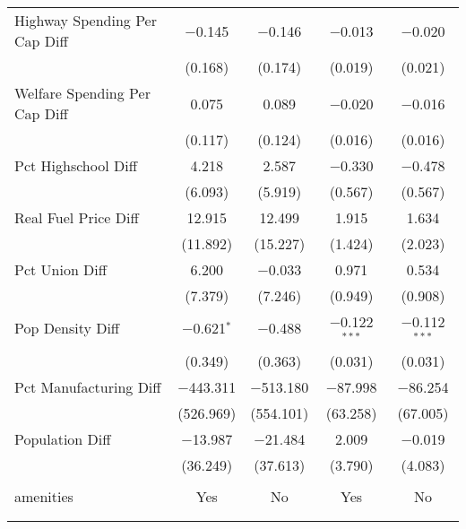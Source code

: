 \begin{table}[!htbp]
\begin{tabular}{@{\extracolsep{5pt}}lcccc}
  Highway Spending Per Cap Diff & $-$0.145 & $-$0.146 & $-$0.013 & $-$0.020 \\ 
  & (0.168) & (0.174) & (0.019) & (0.021) \\ 
  Welfare Spending Per Cap Diff & 0.075 & 0.089 & $-$0.020 & $-$0.016 \\ 
  & (0.117) & (0.124) & (0.016) & (0.016) \\ 
  Pct Highschool Diff & 4.218 & 2.587 & $-$0.330 & $-$0.478 \\ 
  & (6.093) & (5.919) & (0.567) & (0.567) \\ 
  Real Fuel Price Diff & 12.915 & 12.499 & 1.915 & 1.634 \\ 
  & (11.892) & (15.227) & (1.424) & (2.023) \\ 
  Pct Union Diff & 6.200 & $-$0.033 & 0.971 & 0.534 \\ 
  & (7.379) & (7.246) & (0.949) & (0.908) \\ 
  Pop Density Diff & $-$0.621$^{*}$ & $-$0.488 & $-$0.122$^{***}$ & $-$0.112$^{***}$ \\ 
  & (0.349) & (0.363) & (0.031) & (0.031) \\ 
  Pct Manufacturing Diff & $-$443.311 & $-$513.180 & $-$87.998 & $-$86.254 \\ 
  & (526.969) & (554.101) & (63.258) & (67.005) \\ 
  Population Diff & $-$13.987 & $-$21.484 & 2.009 & $-$0.019 \\ 
  & (36.249) & (37.613) & (3.790) & (4.083) \\ 
 \hline \\[-1.8ex] 
amenities & Yes & No & Yes & No \\ 
\hline \\[-1.8ex] 
\hline 
\hline \\[-1.8ex] 
\end{tabular} 
\end{table} 
